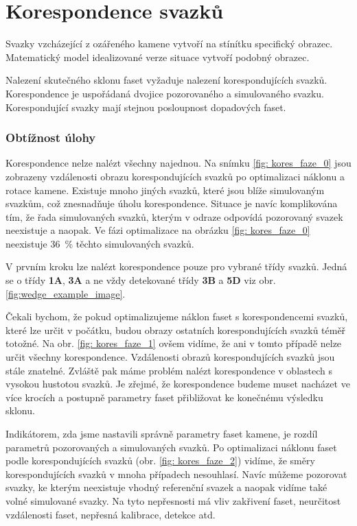 \part{Korespondence svazků}

Svazky vzcházející z ozářeného kamene vytvoří na stínítku specifický obrazec. Matematický model idealizované verze situace vytvoří podobný obrazec. 

Nalezení skutečného sklonu faset vyžaduje nalezení korespondujících svazků. Korespondence je uspořádaná dvojice pozorovaného a simulovaného svazku. Korespondující svazky mají stejnou posloupnost dopadových faset.
\vspace{4mm}
\section{Obtížnost úlohy}
	Korespondence nelze nalézt všechny najednou. Na snímku \ref{fig: kores_faze_0} jsou zobrazeny vzdálenosti obrazu korespondujících svazků po optimalizaci náklonu a rotace kamene.  Existuje mnoho jiných svazků, které jsou blíže simulovaným svazkům, což znesnadňuje úholu korespondence. Situace je navíc komplikována tím, že řada simulovaných svazků, kterým v odraze odpovídá pozorovaný svazek neexistuje a naopak. Ve fázi optimalizace na obrázku \ref{fig: kores_faze_0} neexistuje \SI{36}{\percent} těchto simulovaných svazků. 
	
	  V prvním kroku lze nalézt korespondence pouze pro vybrané třídy svazků. Jedná se o třídy \textbf{1A}, \textbf{3A} a ne vždy detekované třídy \textbf{3B} a \textbf{5D} viz obr. \ref{fig:wedge_example_image}. 
	
	Čekali bychom, že pokud optimalizujeme náklon faset s korespondencemi svazků, které lze určit v počátku, budou obrazy ostatních korespondujících svazků téměř totožné. Na obr. \ref{fig: kores_faze_1} ovšem vidíme, že ani v tomto případě nelze určit všechny korespondence. Vzdálenosti obrazů korespondujících svazků jsou stále znatelné. Zvláště pak máme problém nalézt korespondence v oblastech s vysokou hustotou svazků. Je zřejmé, že korespondence budeme muset nacházet ve více krocích a postupně parametry faset přibližovat ke konečnému výsledku sklonu. 

Indikátorem, zda jsme nastavili správně parametry faset kamene, je rozdíl parametrů pozorovaných a simulovaných svazků. Po optimalizaci náklonu faset podle korespondujících svazků (obr. \ref{fig: kores_faze_2}) vidíme, že směry korespondujících svazků v mnoha případech nesouhlasí. Navíc můžeme pozorovat svazky, ke kterým neexistuje vhodný referenční svazek a naopak vidíme také volné simulované svazky. Na tyto nepřesnosti má vliv zakřivení faset, neurčitost vzdálenosti faset, nepřesná kalibrace, detekce atd.  

